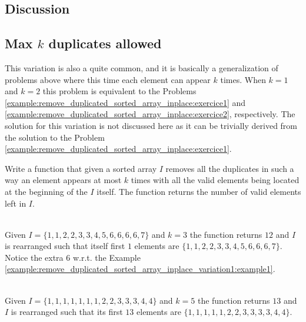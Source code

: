 \subsection{Discussion}



\subsection{Max $k$ duplicates allowed}
This variation is also a quite common, and it is basically a generalization of problems above where this time each element can appear $k$ times.
When $k= 1$ and $k=2$ this problem is equivalent to the Problems \ref{example:remove_duplicated_sorted_array_inplace:exercice1} and \ref{example:remove_duplicated_sorted_array_inplace:exercice2}, respectively.
The solution for this variation is not discussed here as it can be trivially derived from the solution to the Problem \ref{example:remove_duplicated_sorted_array_inplace:exercice1}.
\begin{exercise}
	Write a function that given a sorted array $I$ removes all the 
	duplicates in such a way an element appears at most $k$ times with all the valid elements being located at the beginning of the $I$ itself.
	The function returns the number of valid elements left in $I$.
	
	\label{example:remove_duplicated_sorted_array_inplace_variation:exercice3}
	
		\begin{example}
			\label{example:remove_duplicated_sorted_array_inplace_variation2:example1}
			\hfill \\
			Given $I=\{1,1,2,2,3,3,4,5,6,6,6,6,7\}$ and $k=3$ the function returns $12$ and $I$ is rearranged such
			that itself first $1$ elements are $\{1,1,2,2,3,3,4,5,6,6,6,7\}$. Notice the extra $6$ w.r.t. the Example \ref{example:remove_duplicated_sorted_array_inplace_variation1:example1}.
		\end{example}
	
		\begin{example}
			\label{example:remove_duplicated_sorted_array_inplace_variation2:example2}
			\hfill \\
			Given $I=\{1,1,1,1,1,1,1,2,2,3,3,3,4,4\}$ and $k=5$ the function returns $13$ and $I$ is rearranged such that its first $13$
			elements are $\{1,1,1,1,1,2,2,3,3,3,3,4,4\}$.	
		\end{example}
	\end{exercise}